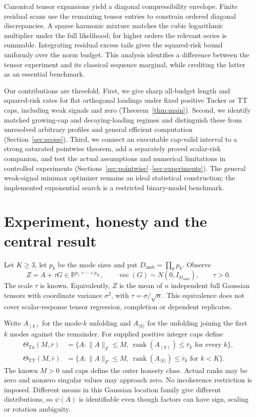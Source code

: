 \documentclass[11pt]{article}
\newcommand{\R}{\mathbb R}
\newcommand{\norm}[1]{\lVert #1\rVert}
\newcommand{\rank}{\operatorname{rank}}
\newcommand{\Tu}{\mathrm{Tu}}
\newcommand{\TT}{\mathrm{TT}}
\begin{document}
Canonical tensor expansions yield a diagonal compressibility envelope. Finite residual scans use the remaining tensor entries to constrain ordered diagonal discrepancies. A sparse harmonic mixture matches the cubic logarithmic multiplier under the full likelihood; for higher orders the relevant series is summable. Integrating residual excess tails gives the squared-risk bound uniformly over the norm budget. This analysis identifies a difference between the tensor experiment and its classical sequence marginal, while crediting the latter as an essential benchmark.

Our contributions are threefold. First, we give sharp all-budget length and squared-risk rates for flat orthogonal loadings under fixed positive Tucker or TT caps, including weak signals and zero (Theorem~\ref{thm:main}). Second, we identify matched growing-cap and decaying-loading regimes and distinguish these from unresolved arbitrary profiles and general efficient computation (Section~\ref{sec:scope}). Third, we connect an executable cap-valid interval to a strong saturated pointwise theorem, add a separately proved scalar-risk companion, and test the actual assumptions and numerical limitations in controlled experiments (Sections~\ref{sec:pointwise}--\ref{sec:experiments}). The general weak-signal minimax optimizer remains an ideal statistical construction; the implemented exponential search is a restricted binary-model benchmark.

\section{Experiment, honesty and the central result}\label{sec:model}
Let $K\ge3$, let $p_k$ be the mode sizes and put $D_{\mathrm{amb}}=\prod_kp_k$. Observe
\begin{equation}\label{eq:model}
 Z=A+\tau G\in\R^{p_1\times\cdots\times p_K},\qquad
 \operatorname{vec}(G)\sim N(0,I_{D_{\mathrm{amb}}}),\qquad \tau>0.
\end{equation}
The scale $\tau$ is known. Equivalently, $Z$ is the mean of $n$ independent full Gaussian tensors with coordinate variance $\sigma^2$, with $\tau=\sigma/\sqrt n$. This equivalence does not cover scalar-response tensor regression, completion or dependent replicates.

Write $A_{(k)}$ for the mode-$k$ unfolding and $A_{\langle k\rangle}$ for the unfolding joining the first $k$ modes against the remainder. For supplied positive integer caps define
\begin{align*}
 \Theta_{\Tu}(M,\bar r)&=\{A:\norm A_F\le M,\ \rank(A_{(k)})\le\bar r_k\text{ for every }k\},\\
 \Theta_{\TT}(M,\bar r)&=\{A:\norm A_F\le M,\ \rank(A_{\langle k\rangle})\le\bar r_k\text{ for }k<K\}.
\end{align*}
The known $M>0$ and caps define the outer honesty class. Actual ranks may be zero and nonzero singular values may approach zero. No incoherence restriction is imposed. Different means in this Gaussian location family give different distributions, so $\psi(A)$ is identifiable even though factors can have sign, scaling or rotation ambiguity.
\end{document}
